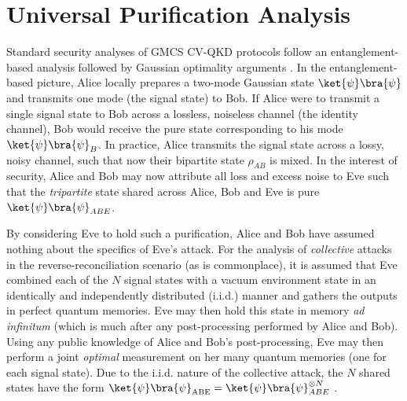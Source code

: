 ﻿\documentclass[12pt]{article}
\begin{document}
\section{Universal Purification Analysis}
\label{app: universal purification analysis}

Standard security analyses of GMCS CV-QKD protocols follow an entanglement-based analysis followed by Gaussian optimality arguments \cite{Usenko-2025, Laudenbach-2018}. In the entanglement-based picture, Alice locally prepares a two-mode Gaussian state $\ket{\psi}\bra{\psi}$ and transmits one mode (the signal state) to Bob. If Alice were to transmit a single signal state to Bob across a lossless, noiseless channel (the identity channel), Bob would receive the pure state corresponding to his mode $\ket{\psi}\bra{\psi}_B$. In practice, Alice transmits the signal state across a lossy, noisy channel, such that now their bipartite state $\rho_{AB}$ is mixed. In the interest of security, Alice and Bob may now attribute all loss and excess noise to Eve such that the \textit{tripartite} state shared across Alice, Bob and Eve is pure $\ket{\psi}\bra{\psi}_{ABE}$.

By considering Eve to hold such a purification, Alice and Bob have assumed nothing about the specifics of Eve's attack. For the analysis of \textit{collective} attacks in the reverse-reconciliation scenario (as is commonplace), it is assumed that Eve combined each of the $N$ signal states with a vacuum environment state in an identically and independently distributed (i.i.d.) manner and gathers the outputs in perfect quantum memories. Eve may then hold this state in memory \textit{ad infinitum} (which is much after any post-processing performed by Alice and Bob). Using any public knowledge of Alice and Bob's post-processing, Eve may then perform a joint \textit{optimal} measurement on her many quantum memories (one for each signal state). Due to the i.i.d. nature of the collective attack, the $N$ shared states have the form $\ket{\psi}\bra{\psi}_\text{ABE} = \ket{\psi}\bra{\psi}_{ABE}^{\otimes N}$ \cite{Scarani-2009}.
\end{document}
